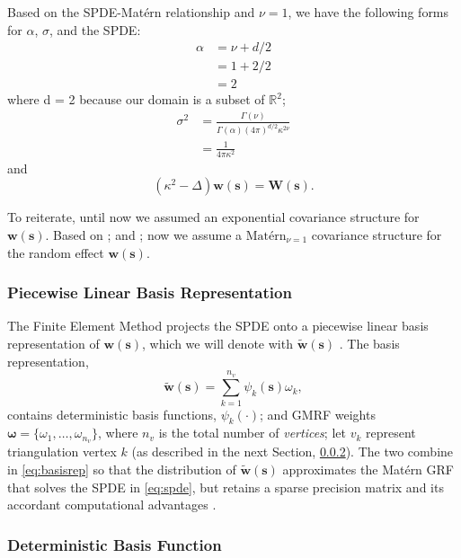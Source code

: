 Based on the SPDE-Mat\'ern relationship and $\nu = 1$, we have the following forms for $\alpha$, $\sigma$, and the SPDE:
\begin{align}
\alpha &= \nu + d/2 \nonumber \\
&= 1 +2/2 \nonumber \\
&= 2 \nonumber
\end{align}
where d = 2 because our domain is a subset of $\mathbb{R}^{2}$;
\begin{align}
\sigma^{2} &= \frac{\Gamma(\nu)}{\Gamma(\alpha)(4\pi)^{d/2}\kappa^{2\nu}} \nonumber \nonumber \\
&= \frac{1}{4 \pi \kappa^{2}} \nonumber
\end{align}
and 
\begin{equation} \label{eq:spde}
(\kappa^{2} - \Delta)\pmb{w}(\pmb{s}) = \pmb{W}(\pmb{s}).
\end{equation}

To reiterate, until now we assumed an exponential covariance structure for $\pmb{w}(\pmb{s})$. Based on \cite{Whittle1954}; \cite{Mondal2017} and \cite{Lindgren2015}; now we assume a $\text{Mat\'ern}_{\nu = 1}$ covariance structure for the random effect $\pmb{w}(\pmb{s})$. 

\subsubsection{Piecewise Linear Basis Representation}
The Finite Element Method projects the SPDE onto a piecewise linear basis representation of $\pmb{w}(\pmb{s})$, which we will denote with $\widetilde{\pmb{w}}(\pmb{s})$ \citep{Simpson2012}. The basis representation,
\begin{equation} \label{eq:basisrep}
\widetilde{\pmb{w}}(\pmb{s}) = \sum_{k=1}^{n_{v}} \psi_{k}(\pmb{s})\omega_{k},
\end{equation}
contains deterministic basis functions, $\psi_{k}(\cdot)$; and GMRF weights $\pmb{\omega} = \{\omega_{1},\dots,\omega_{n_{v}}\}$, where $n_{v}$ is the total number of {\it vertices}; let $v_{k}$ represent triangulation vertex $k$ (as described in the next Section, \ref{dbf}). The two combine in \ref{eq:basisrep} so that the distribution of $\widetilde{\pmb{w}}(\pmb{s})$ approximates the Mat\'ern GRF that solves the SPDE in \ref{eq:spde}, but retains a sparse precision matrix and its accordant computational advantages \citep{Lindgren2011}. 

\subsubsection{Deterministic Basis Function} \label{dbf} %

